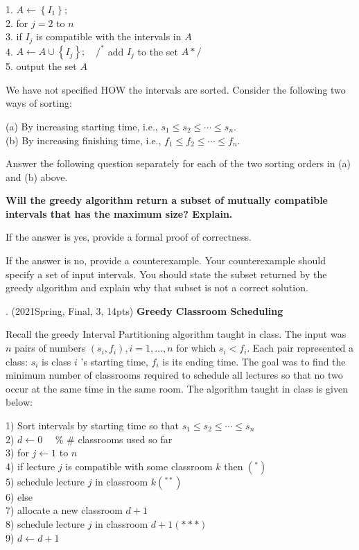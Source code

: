 \begin{spacing}{1.3}
    1. $A \leftarrow\left\{I_{1}\right\}$;\\
    2. for $j=2$ to $n$\\
    3. \quad if $I_{j}$ is compatible with the intervals in $A$\\
    4. \quad \quad \quad $A \leftarrow A \cup\left\{I_{j}\right\} ; \quad /^{*}$ add $I_{j}$ to the set $A * /$\\
    5. output the set $A$

    We have not specified HOW the intervals are sorted. Consider the following two ways of sorting:
    
    \noindent (a) By increasing starting time, i.e., $s_{1} \leq s_{2} \leq \cdots \leq s_{n}$.\\
    (b) By increasing finishing time, i.e., $f_{1} \leq f_{2} \leq \cdots \leq f_{n}$.
    
    Answer the following question separately for each of the two sorting orders in (a) and (b) above.
    
    {\bf Will the greedy algorithm return a subset of mutually compatible intervals that has the maximum size? Explain.}
    
    If the answer is yes, provide a formal proof of correctness.
    
    If the answer is no, provide a counterexample. Your counterexample should specify a set of input intervals. You should state the subset returned by the greedy algorithm and explain why that subset is not a correct solution.


    . (2021Spring, Final, 3, 14pts) {\bf Greedy Classroom Scheduling}

    Recall the greedy Interval Partitioning algorithm taught in class. The input was $n$ pairs of numbers $\left(s_{i}, f_{i}\right), i=1, \ldots, n$ for which $s_{i}<f_{i}$. Each pair represented a class: $s_{i}$ is class $i$ 's starting time, $f_{i}$ is its ending time. The goal was to find the minimum number of classrooms required to schedule all lectures so that no two occur at the same time in the same room. The algorithm taught in class is given below:
    
    1) Sort intervals by starting time so that $s_{1} \leq s_{2} \leq \cdots \leq s_{n}$\\
    2) $d \leftarrow 0 \quad$ \% \# classrooms used so far\\
    3) for $j \leftarrow 1$ to $n$\\
    4) \quad if lecture $j$ is compatible with some classroom $k$ then $\left(^{*}\right)$\\
    5) \quad \qquad schedule lecture $j$ in classroom $k\left(^{* *}\right)$\\
    6) \quad else\\
    7) \quad \qquad allocate a new classroom $d+1$\\
    8) \quad \qquad schedule lecture $j$ in classroom $d+1(* * *)$\\
    9) \quad \qquad $d \leftarrow d+1$
    

\end{spacing}
